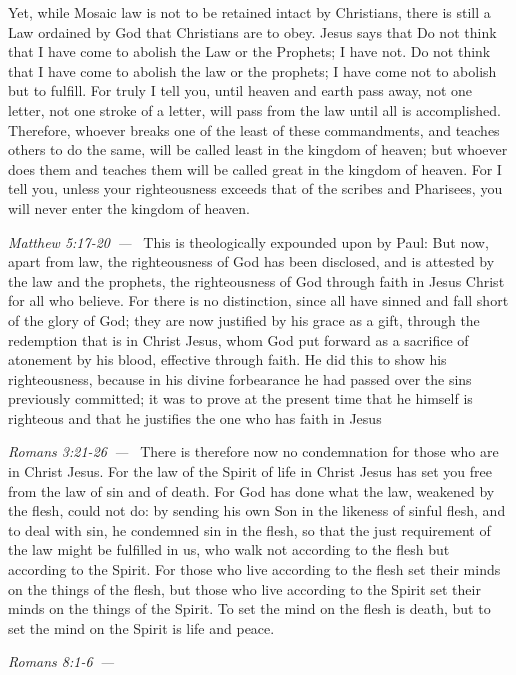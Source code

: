 \documentclass[10pt]{article}
\let\oldquote\quote
\let\endoldquote\endquote
\renewenvironment{quote}[2][]
  {\if\relax\detokenize{#1}\relax
     \def\quoteauthor{#2}%
   \else
     \def\quoteauthor{#2~---~#1}%
   \fi
   \oldquote}
  {\par\nobreak\smallskip\hfill\textit{\quoteauthor}%
   \endoldquote\addvspace{\bigskipamount}}
\begin{document}
Yet, while Mosaic law is not to be retained intact by Christians, there is still a Law ordained by God that Christians are to obey. Jesus says that 
\begin{quote}{Matthew 5:17-20}
Do not think that I have come to abolish the Law or the Prophets; I have not. Do not think that I have come to abolish the law or the prophets; I have come not to abolish but to fulfill. For truly I tell you, until heaven and earth pass away, not one letter, not one stroke of a letter, will pass from the law until all is accomplished. Therefore, whoever breaks one of the least of these commandments, and teaches others to do the same, will be called least in the kingdom of heaven; but whoever does them and teaches them will be called great in the kingdom of heaven. For I tell you, unless your righteousness exceeds that of the scribes and Pharisees, you will never enter the kingdom of heaven.
\end{quote}
This is theologically expounded upon by Paul:
\begin{quote}{Romans 3:21-26}
But now, apart from law, the righteousness of God has been disclosed, and is attested by the law and the prophets, the righteousness of God through faith in Jesus Christ for all who believe. For there is no distinction, since all have sinned and fall short of the glory of God; they are now justified by his grace as a gift, through the redemption that is in Christ Jesus, whom God put forward as a sacrifice of atonement by his blood, effective through faith. He did this to show his righteousness, because in his divine forbearance he had passed over the sins previously committed; it was to prove at the present time that he himself is righteous and that he justifies the one who has faith in Jesus
\end{quote}
\begin{quote}{Romans 8:1-6}
There is therefore now no condemnation for those who are in Christ Jesus. For the law of the Spirit of life in Christ Jesus has set you free from the law of sin and of death. For God has done what the law, weakened by the flesh, could not do: by sending his own Son in the likeness of sinful flesh, and to deal with sin, he condemned sin in the flesh, so that the just requirement of the law might be fulfilled in us, who walk not according to the flesh but according to the Spirit. For those who live according to the flesh set their minds on the things of the flesh, but those who live according to the Spirit set their minds on the things of the Spirit. To set the mind on the flesh is death, but to set the mind on the Spirit is life and peace. 
\end{quote}
\end{document}
